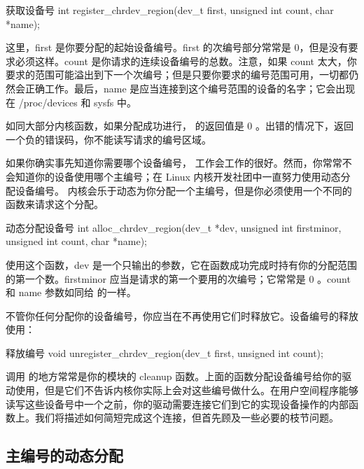 \documentclass[lang=cn,newtx,10pt,scheme=chinese]{elegantbook}
\begin{document}
\begin{mycode}{获取设备号}
int register_chrdev_region(dev_t first, unsigned int count, char *name);
\end{mycode}

这里，first 是你要分配的起始设备编号。first 的次编号部分常常是 0，但是没有要求必须这样。count 是你请求的连续设备编号的总数。注意，如果 count 太大，你要求的范围可能溢出到下一个次编号；但是只要你要求的编号范围可用，一切都仍然会正确工作。最后，name 是应当连接到这个编号范围的设备的名字；它会出现在 /proc/devices 和 sysfs 中。

如同大部分内核函数，如果分配成功进行， 的返回值是 0 。出错的情况下，返回一个负的错误码，你不能读写请求的编号区域。

如果你确实事先知道你需要哪个设备编号， 工作会工作的很好。然而，你常常不会知道你的设备使用哪个主编号；在 Linux 内核开发社团中一直努力使用动态分配设备编号。 内核会乐于动态为你分配一个主编号，但是你必须使用一个不同的函数来请求这个分配。

\begin{mycode}{动态分配设备号}
int alloc_chrdev_region(dev_t *dev, unsigned int firstminor, unsigned int count, char *name);
\end{mycode}

使用这个函数，dev 是一个只输出的参数，它在函数成功完成时持有你的分配范围的第一个数。firstminor 应当是请求的第一个要用的次编号；它常常是 0 。count 和 name 参数如同给  的一样。

不管你任何分配你的设备编号，你应当在不再使用它们时释放它。设备编号的释放使用：

\begin{mycode}{释放编号}
void unregister_chrdev_region(dev_t first, unsigned int count);
\end{mycode}

调用  的地方常常是你的模块的 cleanup 函数。上面的函数分配设备编号给你的驱动使用，但是它们不告诉内核你实际上会对这些编号做什么。在用户空间程序能够读写这些设备号中一个之前，你的驱动需要连接它们到它的实现设备操作的内部函数上。我们将描述如何简短完成这个连接，但首先顾及一些必要的枝节问题。

\subsection{主编号的动态分配}
\end{document}
